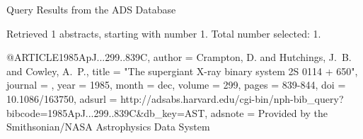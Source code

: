 Query Results from the ADS Database


Retrieved 1 abstracts, starting with number 1.  Total number selected: 1.

@ARTICLE{1985ApJ...299..839C,
   author = {{Crampton}, D. and {Hutchings}, J.~B. and {Cowley}, A.~P.},
    title = "{The supergiant X-ray binary system 2S 0114 + 650}",
  journal = {\apj},
     year = 1985,
    month = dec,
   volume = 299,
    pages = {839-844},
      doi = {10.1086/163750},
   adsurl = {http://adsabs.harvard.edu/cgi-bin/nph-bib_query?bibcode=1985ApJ...299..839C&db_key=AST},
  adsnote = {Provided by the Smithsonian/NASA Astrophysics Data System}
}


